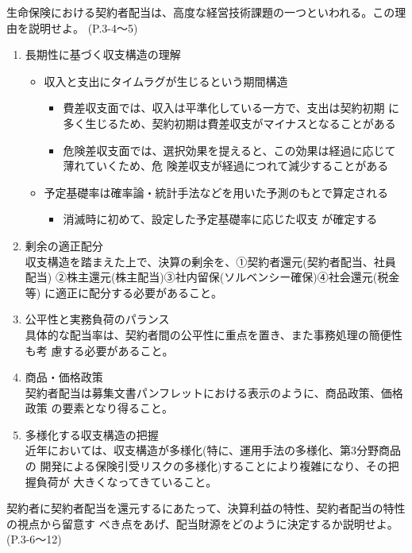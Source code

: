 \documentclass[report,gutter=10mm,fore-edge=10mm,uplatex,dvipdfmx]{jlreq}
\begin{document}
生命保険における契約者配当は、高度な経営技術課題の一つといわれる。この理由を説明せよ。
(P.3-4〜5)
\begin{enumerate}
 \item 長期性に基づく収支構造の理解
\begin{itemize}
 \item 収入と支出にタイムラグが生じるという期間構造
\begin{itemize}
 \item 費差収支面では、収入は平準化している一方で、支出は契約初期
に多く生じるため、契約初期は費差収支がマイナスとなることがある
 \item 危険差収支面では、選択効果を提えると、この効果は経過に応じて薄れていくため、危
険差収支が経過につれて減少することがある
\end{itemize}
 \item 予定基礎率は確率論・統計手法などを用いた予測のもとで算定される
\begin{itemize}
 \item 消滅時に初めて、設定した予定基礎率に応じた収支
が確定する
\end{itemize}
\end{itemize}
 \item 剰余の適正配分\\
収支構造を踏まえた上で、決算の剰余を、①契約者還元(契約者配当、社員配当)
②株主還元(株主配当)③社内留保(ソルベンシー確保)④社会還元(税金等)
に適正に配分する必要があること。
 \item 公平性と実務負荷のパランス\\
具体的な配当率は、契約者間の公平性に重点を置き、また事務処理の簡便性も考
慮する必要があること。
 \item 商品・価格政策\\
契約者配当は募集文書パンフレットにおける表示のように、商品政策、価格政策
の要素となり得ること。
 \item 多様化する収支構造の把握\\
近年においては、収支構造が多様化(特に、運用手法の多様化、第3分野商品の
開発による保険引受リスクの多様化)することにより複雑になり、その把握負荷が
大きくなってきていること。
\end{enumerate}
契約者に契約者配当を還元するにあたって、決算利益の特性、契約者配当の特性の視点から留意す
べき点をあげ、配当財源をどのように決定するか説明せよ。
(P.3-6～12)
\end{document}
